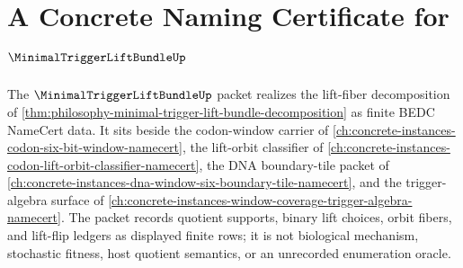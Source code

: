 \chapter{A Concrete Naming Certificate for $\MinimalTriggerLiftBundleUp$}
\label{ch:concrete-instances-minimal-trigger-lift-bundle-namecert}

The $\MinimalTriggerLiftBundleUp$ packet realizes the lift-fiber decomposition of \autoref{thm:philosophy-minimal-trigger-lift-bundle-decomposition} as finite BEDC NameCert data. It sits beside the codon-window carrier of \autoref{ch:concrete-instances-codon-six-bit-window-namecert}, the lift-orbit classifier of \autoref{ch:concrete-instances-codon-lift-orbit-classifier-namecert}, the DNA boundary-tile packet of \autoref{ch:concrete-instances-dna-window-six-boundary-tile-namecert}, and the trigger-algebra surface of \autoref{ch:concrete-instances-window-coverage-trigger-algebra-namecert}. The packet records quotient supports, binary lift choices, orbit fibers, and lift-flip ledgers as displayed finite rows; it is not biological mechanism, stochastic fitness, host quotient semantics, or an unrecorded enumeration oracle.

